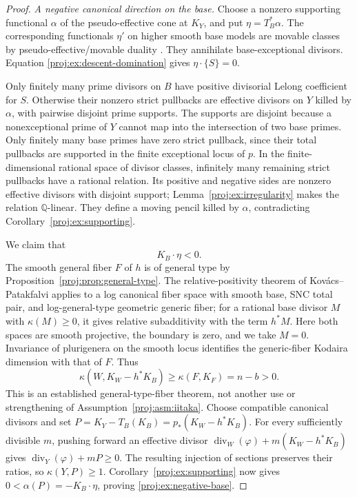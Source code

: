 \documentclass[11pt,letterpaper]{article}
\newcommand{\Q}{\mathbb{Q}}
\theoremstyle{definition}
\theoremstyle{remark}
\begin{document}
\begin{proof}
\smallskip
\noindent\emph{A negative canonical direction on the base.}
Choose a nonzero supporting functional \(\alpha\) of the
pseudo-effective cone at \(K_Y\), and put
\(\eta=T_B^*\alpha\). The corresponding functionals \(\eta'\)
on higher smooth base models are movable classes by
pseudo-effective/movable duality \cite[Theorem~0.2]{BDPP}.
They annihilate base-exceptional divisors. Equation
\eqref{proj:ex:descent-domination} gives \(\eta\cdot\{S\}=0\).

Only finitely many prime divisors on \(B\) have positive
divisorial Lelong coefficient for \(S\). Otherwise their
nonzero strict pullbacks are effective divisors on \(Y\)
killed by \(\alpha\), with pairwise disjoint prime supports.
The supports are disjoint because a nonexceptional prime of
\(Y\) cannot map into the intersection of two base primes.
Only finitely many base primes have zero strict pullback,
since their total pullbacks are supported in the finite
exceptional locus of \(p\). In the finite-dimensional rational
space of divisor classes, infinitely many remaining strict
pullbacks have a rational relation. Its positive and negative
sides are nonzero effective divisors with disjoint support;
Lemma~\ref{proj:ex:irregularity} makes the relation
\(\Q\)-linear. They define a moving pencil killed by
\(\alpha\), contradicting Corollary~\ref{proj:ex:supporting}.

We claim that
\begin{equation}\label{proj:ex:negative-base}
 K_B\cdot\eta<0.
\end{equation}
The smooth general fiber \(F\) of \(h\) is of general type by
Proposition~\ref{proj:prop:general-type}. The relative-positivity
theorem of Kov\'acs--Patakfalvi
\cite[Theorem~9.9]{Proj-KovacsPatakfalvi2017} applies to a log
canonical fiber space with smooth base, SNC total pair, and
log-general-type geometric generic fiber; for a rational base
divisor \(M\) with \(\kappa(M)\geq0\), it gives relative
subadditivity with the term \(h^*M\). Here both spaces are
smooth projective, the boundary is zero, and we take \(M=0\).
Invariance of plurigenera on the smooth locus identifies the
generic-fiber Kodaira dimension with that of \(F\). Thus
\begin{equation}\label{proj:ex:relative-positive}
 \kappa(W,K_W-h^*K_B)\geq \kappa(F,K_F)=n-b>0.
\end{equation}
This is an established general-type-fiber theorem, not another
use or strengthening of Assumption~\ref{proj:asm:iitaka}.
Choose compatible canonical divisors and set
\(P=K_Y-T_B(K_B)=p_*(K_W-h^*K_B)\).
For every sufficiently divisible \(m\), pushing forward an
effective divisor
\(\operatorname{div}_W(\varphi)+m(K_W-h^*K_B)\)
gives
\(\operatorname{div}_Y(\varphi)+mP\geq0\).
The resulting injection of sections preserves their ratios,
so \(\kappa(Y,P)\geq1\). Corollary~\ref{proj:ex:supporting} now gives
\(0<\alpha(P)=-K_B\cdot\eta\), proving
\eqref{proj:ex:negative-base}.


\end{proof}
\end{document}
